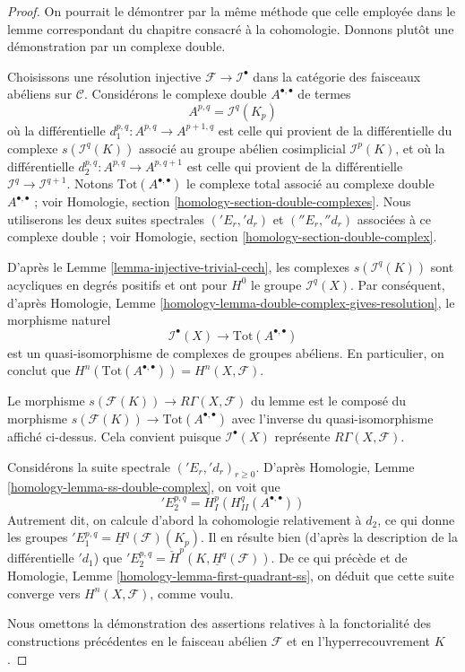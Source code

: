 \begin{proof}
On pourrait le démontrer par la même méthode que celle employée dans le lemme
correspondant du chapitre consacré à la cohomologie. Donnons plutôt une
démonstration par un complexe double.

\medskip\noindent
Choisissons une résolution injective $\mathcal{F} \to \mathcal{I}^\bullet$
dans la catégorie des faisceaux abéliens sur $\mathcal{C}$. Considérons le
complexe double $A^{\bullet, \bullet}$ de termes
$$
A^{p, q} = \mathcal{I}^q(K_p)
$$
où la différentielle $d_1^{p, q} : A^{p, q} \to A^{p + 1, q}$ est celle
qui provient de la différentielle du complexe $s(\mathcal{I}^q(K))$
associé au groupe abélien cosimplicial $\mathcal{I}^p(K)$,
et où la différentielle $d_2^{p, q} : A^{p, q} \to A^{p, q + 1}$ est celle
qui provient de la différentielle $\mathcal{I}^q \to \mathcal{I}^{q + 1}$.
Notons $\text{Tot}(A^{\bullet, \bullet})$ le complexe total associé au
complexe double $A^{\bullet, \bullet}$ ; voir
Homologie, section \ref{homology-section-double-complexes}.
Nous utiliserons les deux suites
spectrales $({}'E_r, {}'d_r)$ et $({}''E_r, {}''d_r)$
associées à ce complexe double ; voir
Homologie, section \ref{homology-section-double-complex}.

\medskip\noindent
D'après le Lemme \ref{lemma-injective-trivial-cech},
les complexes $s(\mathcal{I}^q(K))$ sont acycliques en
degrés positifs et ont pour $H^0$ le groupe $\mathcal{I}^q(X)$.
Par conséquent, d'après
Homologie, Lemme \ref{homology-lemma-double-complex-gives-resolution},
le morphisme naturel
$$
\mathcal{I}^\bullet(X) \longrightarrow \text{Tot}(A^{\bullet, \bullet})
$$
est un quasi-isomorphisme de complexes de groupes abéliens. En particulier,
on conclut que $H^n(\text{Tot}(A^{\bullet, \bullet})) = H^n(X, \mathcal{F})$.

\medskip\noindent
Le morphisme $s(\mathcal{F}(K)) \longrightarrow R\Gamma(X, \mathcal{F})$ du
lemme est le composé du morphisme
$s(\mathcal{F}(K)) \to \text{Tot}(A^{\bullet, \bullet})$
avec l'inverse
du quasi-isomorphisme affiché ci-dessus. Cela convient puisque
$\mathcal{I}^\bullet(X)$ représente $R\Gamma(X, \mathcal{F})$.

\medskip\noindent
Considérons la suite spectrale $({}'E_r, {}'d_r)_{r \geq 0}$. D'après
Homologie, Lemme \ref{homology-lemma-ss-double-complex},
on voit que
$$
{}'E_2^{p, q} = H^p_I(H^q_{II}(A^{\bullet, \bullet}))
$$
Autrement dit, on calcule d'abord la cohomologie relativement à
$d_2$, ce qui donne les groupes
${}'E_1^{p, q} = \underline{H}^q(\mathcal{F})(K_p)$.
Il en résulte bien (d'après la description de la différentielle
${}'d_1$) que
${}'E_2^{p, q} = \check{H}^p(K, \underline{H}^q(\mathcal{F}))$.
De ce qui précède et de Homologie, Lemme \ref{homology-lemma-first-quadrant-ss},
on déduit que cette suite converge vers $H^n(X, \mathcal{F})$, comme voulu.

\medskip\noindent
Nous omettons la démonstration des assertions relatives à la fonctorialité des
constructions précédentes en le faisceau abélien $\mathcal{F}$ et en
l'hyperrecouvrement $K$.
\end{proof}









